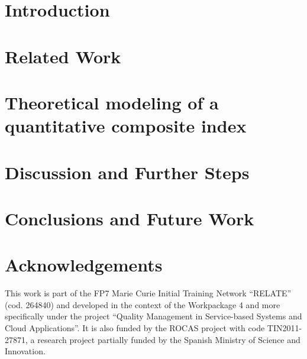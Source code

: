 \documentclass{llncs}
\begin{document}
\section{Introduction}

\section{Related Work}

\section{Theoretical modeling of a quantitative composite index}


\section{Discussion and Further Steps}


\section{Conclusions and Future Work}

\clearpage
\section{Acknowledgements}
This work is part of the FP7 Marie Curie Initial Training Network ``RELATE'' (cod. 264840) and developed in the context 
of the Workpackage 4 and more specifically under the project ``Quality Management in Service-based Systems and Cloud Applications''. It is 
also funded by the ROCAS project with code TIN2011-27871, a research project partially funded by the Spanish Ministry of Science and Innovation.





\end{document}
